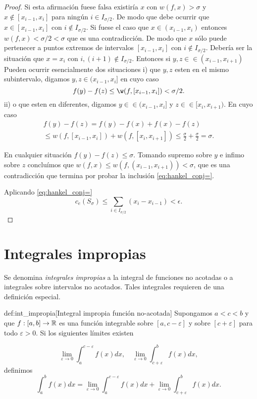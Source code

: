 \begin{proof}
Si esta afirmación fuese falsa existiría $x$ con $w(f,x)>\sigma$ y $x\notin [x_{i-1},x_i]$ para ningún $i\in I_{\sigma/2}$. De modo que debe ocurrir que $x\in   [x_{i-1},x_i]$ con $i\notin I_{\sigma/2}$. Si fuese el caso que  $x\in   (x_{i-1},x_i)$ entonces  $w(f,x)<\sigma/2<\sigma$ que es una contradicción. De modo que $x$ sólo puede pertenecer a puntos extremos de intervalos  $[x_{i-1},x_i]$ con  $i\notin I_{\sigma/2}$. Debería ser la situación que $x=x_i$ con $i,(i+1)\notin I_{\sigma/2}$. Entonces si $y,z\in \in (x_{i-1},x_{i+1})$ Pueden ocurrir esencialmente dos situaciones i) que $y,z$ esten en el mismo subintervalo, digamos  $y,z \in (x_{i-1},x_{i}]$ en cuyo caso
\[
 f(y)-f(z)\leq\w(f, [x_{i-1},x_{i}])<\sigma/2.
\]
ii) o que esten en diferentes, digamos $y\in \in (x_{i-1},x_{i}]$ y $z\in \in [x_{i},x_{i+1})$. En cuyo caso
\begin{multline*}
 f(y)-f(z)=f(y)-f(x)+f(x)-f(z)\\
 \leq w(f,[x_{i-1},x_i])+w(f,[x_{i},x_{i+1}])\leq\frac{\sigma}{2}+\frac{\sigma}{2}=\sigma.
\end{multline*}

En cualquier situación $f(y)-f(z)\leq\sigma$. Tomando supremo sobre $y$ e infimo sobre $z$ concluímos que $w(f,x)\leq w(f,(x_{i-1},x_{i+1}))<\sigma$, que es una contradicción que termina por probar la inclusión  \eqref{eq:hankel_conj=}. 

Aplicando \eqref{eq:hankel_conj=}
\[
 c_e(S_{\sigma})\leq  \sum_{i\in I_{\sigma/2}}(x_i-x_{i-1})<\epsilon.
\] 
\end{proof}

   
   
\section{Integrales impropias}
Se denomina \emph{integrales impropias} a la integral de funciones no acotadas o a integrales sobre intervalos no acotados. Tales integrales requieren de una definición especial.
\begin{definicion}{def:int_impropia}[Integral impropia función no-acotada] Supongamos $a<c<b$ y que $f:[a,b]\to\mathbb{R}$ es una función integrable sobre $[a,c-\varepsilon]$ y sobre $[c+\varepsilon]$ para todo $\varepsilon>0$. Si los siguientes límites existen

\[
 \lim_{\varepsilon\to 0}\int_a^{c-\varepsilon}f(x)dx,\quad \lim_{\varepsilon\to 0}\int_{c+\varepsilon}^bf(x)dx,
\]
definimos 
\begin{equation}\label{eq:int_impro}
 \int_a^bf(x)dx= \lim_{\varepsilon\to 0}\int_a^{c-\varepsilon}f(x)dx+ \lim_{\varepsilon\to 0}\int_{c+\varepsilon}^bf(x)dx.
\end{equation}



 
\end{definicion}

